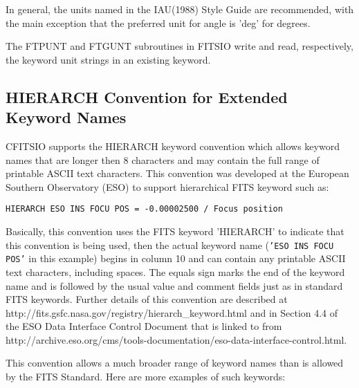 \documentclass[11pt]{book}
\begin{document}
In general, the units named in the IAU(1988) Style Guide are
recommended, with the main exception that the preferred unit for angle
is 'deg' for degrees.

The FTPUNT and FTGUNT subroutines in FITSIO write and read,
respectively, the keyword unit strings in an existing keyword.


\subsection{HIERARCH Convention for Extended Keyword Names}

CFITSIO supports the HIERARCH keyword convention which allows keyword
names that are longer then 8 characters and may contain the full range
of printable ASCII text characters.  This convention
was developed at the European Southern Observatory (ESO)  to support
hierarchical FITS keyword such as:

\begin{verbatim}
HIERARCH ESO INS FOCU POS = -0.00002500 / Focus position
\end{verbatim}
Basically, this convention uses the FITS keyword 'HIERARCH' to indicate
that this convention is being used, then the actual keyword name
({\tt'ESO INS FOCU POS'} in this example) begins in column 10 and can
contain any printable ASCII text characters, including spaces.  The
equals sign marks the end of the keyword name and is followed by the
usual value and comment fields just as in standard FITS keywords.
Further details of this convention are described at
http://fits.gsfc.nasa.gov/registry/hierarch\_keyword.html
and in Section 4.4 of the ESO Data Interface Control Document that
is linked to from
http://archive.eso.org/cms/tools-documentation/eso-data-interface-control.html.

This convention allows a much broader range of keyword names
than is allowed by the FITS Standard.  Here are more examples
of such keywords:
\end{document}
